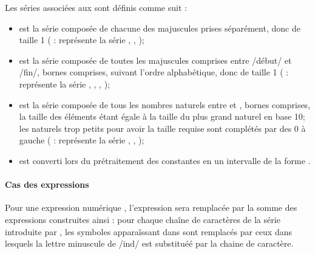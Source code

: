 \documentclass[letterpaper,10pt,french]{sphinxmanual}
\begin{document}
\sphinxAtStartPar
Les séries associées aux  sont définis comme suit :
\begin{itemize}
\item {} 
\sphinxAtStartPar
{} est la série composée de chacune des majuscules prises
séparément, donc de taille 1 ( :  représente la série , , );

\item {} 
\sphinxAtStartPar
{} est la série composée de toutes
les majuscules comprises entre /début/ et /fin/, bornes comprises, suivant
l’ordre alphabétique, donc de taille 1 ( :  représente la série , , , );

\item {} 
\sphinxAtStartPar
{} est la série composée de tous les
nombres naturels entre  et , bornes comprises, la taille des
éléments étant égale à la taille du plus grand naturel en base 10; les
naturels trop petits pour avoir la taille requise  sont complétés par des 0 à
gauche ( :  représente la série , , );

\item {} 
\sphinxAtStartPar
{} est converti lors du prétraitement des constantes
en un intervalle de la forme .

\end{itemize}


\paragraph{Cas des expressions }
\label{\detokenize{mlang:cas-des-expressions-somme}}
\sphinxAtStartPar
Pour une expression numérique
,
l’expression  sera remplacée par la somme des expressions construites
ainsi : pour chaque chaîne de caractères de la série introduite par , les
symboles apparaîssant dans  sont remplacés par ceux dans lesquels la
lettre minuscule de /ind/ est substituéé par la chaine de caractère.
\end{document}
